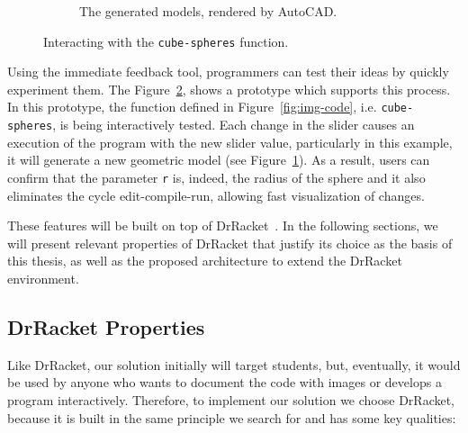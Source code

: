 \begin{figure}[htb]
\begin{subfigure}{0.35\textwidth}
                \caption{The generated models, rendered by AutoCAD.}
                \label{fig:cube}
        \end{subfigure}
        \vspace{-5pt}
        \caption{Interacting with the \texttt{cube-spheres} function.}
        \label{fig:slider}
 \vspace{-10pt}
\end{figure}

Using the immediate feedback tool, programmers can test their ideas by quickly experiment them. The Figure~\ref{fig:slider}, shows a prototype which supports this process. In this prototype, the function defined in Figure~\ref{fig:img-code}, i.e. \texttt{cube-spheres}, is being interactively tested. Each change in the slider causes an execution of the program with the new slider value, particularly in this example, it will generate a new geometric model (see Figure~\ref{fig:cube}). As a result, users can confirm that the parameter \texttt{r} is, indeed, the radius of the sphere and it also eliminates the cycle edit-compile-run, allowing fast visualization of changes.  

These features will be built on top of DrRacket~\cite{findler2002drscheme}. In the following sections, we will present relevant properties of DrRacket that justify its choice as the basis of this thesis, as well as the proposed architecture to extend the DrRacket environment.

\subsection{DrRacket Properties}

Like DrRacket, our solution initially will target students, but, eventually, it would be used by anyone who wants to document the code with images or develops a program interactively. Therefore, to implement our solution we choose DrRacket, because it is built in the same principle we search for and has some key qualities:


